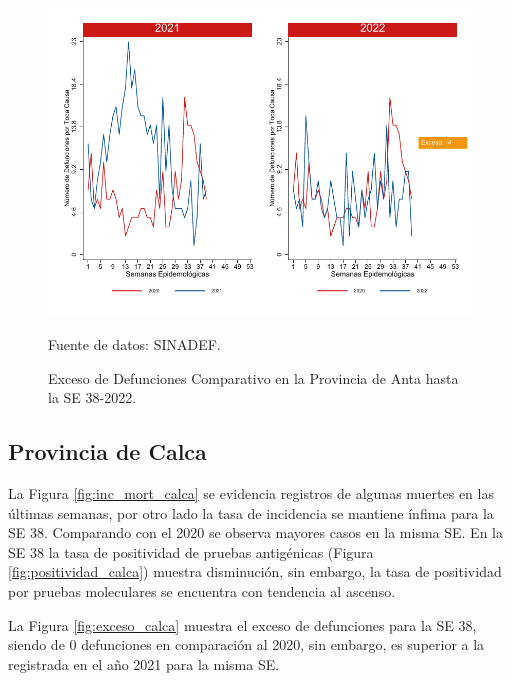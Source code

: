\documentclass[12pt,a4paper,openany]{book}
\begin{document}
	\begin{figure}[h]
		\caption{Exceso de Defunciones Comparativo en la Provincia de Anta hasta la SE 38-2022.}\label{fig:exceso_anta}
		\begin{center}
			\includegraphics[width=0.7\linewidth]{../figuras/exceso_2.pdf}
		\end{center}
		{\footnotesize {Fuente de datos: SINADEF.}}
	\end{figure}
	
	\clearpage
	
	\subsection*{Provincia de Calca}
	\noindent La Figura \ref{fig:inc_mort_calca} se evidencia registros de algunas muertes en las últimas semanas, por otro lado la tasa de incidencia se mantiene ínfima para la SE 38. Comparando con el 2020 se observa mayores casos en la misma SE. En la SE 38 la tasa de positividad de pruebas antigénicas (Figura \ref{fig:positividad_calca}) muestra disminución, sin embargo, la tasa de positividad por pruebas moleculares se encuentra con tendencia al ascenso.
	
	La Figura \ref{fig:exceso_calca} muestra el exceso de defunciones para la SE 38, siendo de 0 defunciones en comparación al 2020, sin embargo, es superior a la registrada en el año 2021 para  la misma SE.
\end{document}
